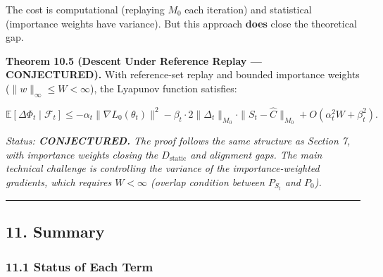 \documentclass[
  12pt,
]{article}
\begin{document}
The cost is computational (replaying \(M_0\) each iteration) and
statistical (importance weights have variance). But this approach
\textbf{does} close the theoretical gap.

\textbf{Theorem 10.5 (Descent Under Reference Replay --- CONJECTURED).}
With reference-set replay and bounded importance weights
(\(\|w\|_\infty \leq W < \infty\)), the Lyapunov function satisfies:

\[\mathbb{E}[\Delta\Phi_t \mid \mathcal{F}_t] \leq -\alpha_t \|\nabla L_0(\theta_t)\|^2 - \beta_t \cdot 2 \|\Delta_t\|_{M_0} \cdot \|S_t - \hat{C}\|_{M_0} + O(\alpha_t^2 W + \beta_t^2).\]

\emph{Status: \textbf{CONJECTURED.} The proof follows the same structure
as Section 7, with importance weights closing the \(D_{\text{static}}\)
and alignment gaps. The main technical challenge is controlling the
variance of the importance-weighted gradients, which requires
\(W < \infty\) (overlap condition between \(P_{S_t}\) and \(P_0\)).}

\begin{center}\rule{0.5\linewidth}{0.5pt}\end{center}

\subsection{11. Summary}\label{summary}

\subsubsection{11.1 Status of Each Term}\label{status-of-each-term}
\end{document}
